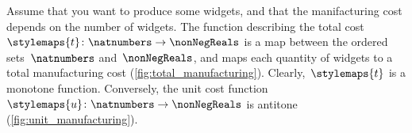 \begin{example}
    Assume that you want to produce some widgets, and that the manifacturing cost depends on the number of widgets.
    The function describing the total cost~$\stylemaps{t}\colon \natnumbers\to \nonNegReals$ is a map between the ordered sets~$\natnumbers$ and~$\nonNegReals$, and maps each quantity of widgets to a total manufacturing cost (\cref{fig:total_manufacturing}).
    Clearly,~$\stylemaps{t}$ is a monotone function.
    Conversely, the unit cost function~$\stylemaps{u}\colon \natnumbers\to \nonNegReals$ is antitone (\cref{fig:unit_manufacturing}).
\end{example}

\begin{figure}[h!]
\end{figure}

